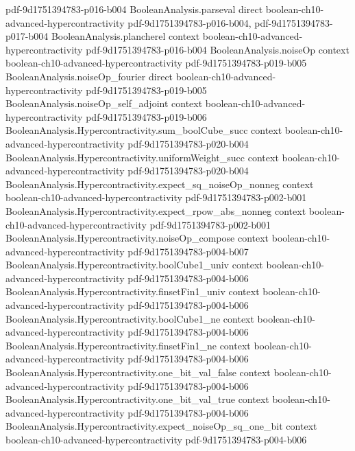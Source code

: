\begin{theorem}
  {pdf-9d1751394783-p016-b004}
\proofstep
  {BooleanAnalysis.parseval}
  {direct}
  {boolean-ch10-advanced-hypercontractivity}
  {pdf-9d1751394783-p016-b004,
    pdf-9d1751394783-p017-b004}
\proofstep
  {BooleanAnalysis.plancherel}
  {context}
  {boolean-ch10-advanced-hypercontractivity}
  {pdf-9d1751394783-p016-b004}
\proofstep
  {BooleanAnalysis.noiseOp}
  {context}
  {boolean-ch10-advanced-hypercontractivity}
  {pdf-9d1751394783-p019-b005}
\proofstep
  {BooleanAnalysis.noiseOp_fourier}
  {direct}
  {boolean-ch10-advanced-hypercontractivity}
  {pdf-9d1751394783-p019-b005}
\proofstep
  {BooleanAnalysis.noiseOp_self_adjoint}
  {context}
  {boolean-ch10-advanced-hypercontractivity}
  {pdf-9d1751394783-p019-b006}
\proofstep
  {BooleanAnalysis.Hypercontractivity.sum_boolCube_succ}
  {context}
  {boolean-ch10-advanced-hypercontractivity}
  {pdf-9d1751394783-p020-b004}
\proofstep
  {BooleanAnalysis.Hypercontractivity.uniformWeight_succ}
  {context}
  {boolean-ch10-advanced-hypercontractivity}
  {pdf-9d1751394783-p020-b004}
\proofstep
  {BooleanAnalysis.Hypercontractivity.expect_sq_noiseOp_nonneg}
  {context}
  {boolean-ch10-advanced-hypercontractivity}
  {pdf-9d1751394783-p002-b001}
\proofstep
  {BooleanAnalysis.Hypercontractivity.expect_rpow_abs_nonneg}
  {context}
  {boolean-ch10-advanced-hypercontractivity}
  {pdf-9d1751394783-p002-b001}
\proofstep
  {BooleanAnalysis.Hypercontractivity.noiseOp_compose}
  {context}
  {boolean-ch10-advanced-hypercontractivity}
  {pdf-9d1751394783-p004-b007}
\proofstep
  {BooleanAnalysis.Hypercontractivity.boolCube1_univ}
  {context}
  {boolean-ch10-advanced-hypercontractivity}
  {pdf-9d1751394783-p004-b006}
\proofstep
  {BooleanAnalysis.Hypercontractivity.finsetFin1_univ}
  {context}
  {boolean-ch10-advanced-hypercontractivity}
  {pdf-9d1751394783-p004-b006}
\proofstep
  {BooleanAnalysis.Hypercontractivity.boolCube1_ne}
  {context}
  {boolean-ch10-advanced-hypercontractivity}
  {pdf-9d1751394783-p004-b006}
\proofstep
  {BooleanAnalysis.Hypercontractivity.finsetFin1_ne}
  {context}
  {boolean-ch10-advanced-hypercontractivity}
  {pdf-9d1751394783-p004-b006}
\proofstep
  {BooleanAnalysis.Hypercontractivity.one_bit_val_false}
  {context}
  {boolean-ch10-advanced-hypercontractivity}
  {pdf-9d1751394783-p004-b006}
\proofstep
  {BooleanAnalysis.Hypercontractivity.one_bit_val_true}
  {context}
  {boolean-ch10-advanced-hypercontractivity}
  {pdf-9d1751394783-p004-b006}
\proofstep
  {BooleanAnalysis.Hypercontractivity.expect_noiseOp_sq_one_bit}
  {context}
  {boolean-ch10-advanced-hypercontractivity}
  {pdf-9d1751394783-p004-b006}
\proofstep

\end{theorem}
